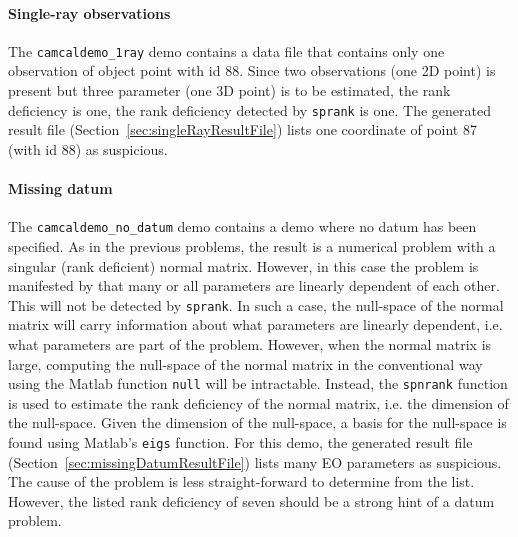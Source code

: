 \documentclass{article}
\begin{document}
\paragraph{Single-ray observations}
\label{sec:orgf03acdd}

The \texttt{camcaldemo\_1ray} demo contains a data file that contains
only one observation of object point with id 88. Since two
observations (one 2D point) is present but three parameter (one 3D
point) is to be estimated, the rank deficiency is one, the rank
deficiency detected by \texttt{sprank} is one. The generated result
file (Section~\ref{sec:singleRayResultFile}) lists one coordinate of
point 87 (with id 88) as suspicious.

\paragraph{Missing datum}
\label{sec:orgab5c8ac}

The \texttt{camcaldemo\_no\_datum} demo contains a demo where no datum
has been specified. As in the previous problems, the result is a
numerical problem with a singular (rank deficient) normal matrix.
However, in this case the problem is manifested by that many or all
parameters are linearly dependent of each other. This will not be
detected by \texttt{sprank}. In such a case, the null-space of the
normal matrix will carry information about what parameters are
linearly dependent, i.e. what parameters are part of the problem.
However, when the normal matrix is large, computing the null-space of
the normal matrix in the conventional way using the Matlab function
\texttt{null} will be intractable. Instead, the \texttt{spnrank}
\citep{Foster2009:Calculating} function is used to estimate the rank
deficiency of the normal matrix, i.e. the dimension of the null-space.
Given the dimension of the null-space, a basis for the null-space is
found using Matlab's \texttt{eigs} function. For this demo, the
generated result file (Section~\ref{sec:missingDatumResultFile}) lists
many EO parameters as suspicious. The cause of the problem is less
straight-forward to determine from the list. However, the listed rank
deficiency of seven should be a strong hint of a datum problem.
\end{document}
